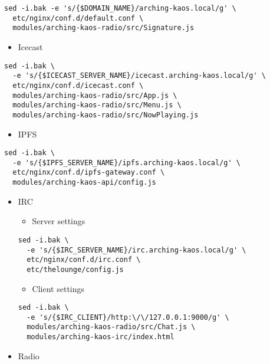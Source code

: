 \documentclass[12pt]{report}
\begin{document}
\begin{verbatim}
sed -i.bak -e 's/{$DOMAIN_NAME}/arching-kaos.local/g' \
  etc/nginx/conf.d/default.conf \
  modules/arching-kaos-radio/src/Signature.js
\end{verbatim}

\begin{itemize}

\item
  Icecast
\end{itemize}

\begin{verbatim}
sed -i.bak \
  -e 's/{$ICECAST_SERVER_NAME}/icecast.arching-kaos.local/g' \
  etc/nginx/conf.d/icecast.conf \
  modules/arching-kaos-radio/src/App.js \
  modules/arching-kaos-radio/src/Menu.js \
  modules/arching-kaos-radio/src/NowPlaying.js
\end{verbatim}

\begin{itemize}

\item
  IPFS
\end{itemize}

\begin{verbatim}
sed -i.bak \
  -e 's/{$IPFS_SERVER_NAME}/ipfs.arching-kaos.local/g' \
  etc/nginx/conf.d/ipfs-gateway.conf \
  modules/arching-kaos-api/config.js
\end{verbatim}

\begin{itemize}

\item
  IRC

  \begin{itemize}

  \item
  Server settings
  \end{itemize}

\begin{verbatim}
sed -i.bak \
  -e 's/{$IRC_SERVER_NAME}/irc.arching-kaos.local/g' \
  etc/nginx/conf.d/irc.conf \
  etc/thelounge/config.js
\end{verbatim}

  \begin{itemize}

  \item
  Client settings
  \end{itemize}

\begin{verbatim}
sed -i.bak \
  -e 's/{$IRC_CLIENT}/http:\/\/127.0.0.1:9000/g' \
  modules/arching-kaos-radio/src/Chat.js \
  modules/arching-kaos-irc/index.html
\end{verbatim}
\item
  Radio
\end{itemize}
\end{document}
